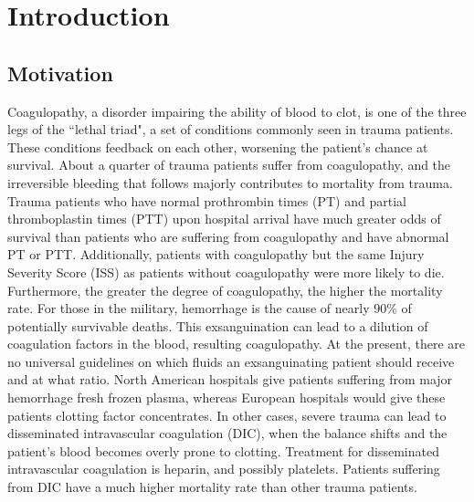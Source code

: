 \documentclass[12pt]{article}
\begin{document}
\section*{Introduction} 
\subsection*{Motivation} Coagulopathy, a disorder impairing the ability of blood to clot, is one of the three legs of the ``lethal triad", a set of conditions commonly seen in trauma patients. These conditions feedback on each other, worsening the patient's chance at survival. About a quarter of trauma patients suffer from coagulopathy, and the irreversible bleeding that follows majorly contributes to mortality from trauma. \cite{kauvar2006impact} Trauma patients who have normal prothrombin times (PT) and partial thromboplastin times (PTT) upon hospital arrival have much greater odds of survival than patients who are suffering from coagulopathy and have abnormal PT or PTT. \cite{macleod2003early} Additionally, patients with coagulopathy but the same Injury Severity Score (ISS) as patients without coagulopathy were more likely to die. \cite{brohi2003acute} Furthermore, the greater the degree of coagulopathy, the higher the mortality rate. \cite{frith2010definition}
For those in the military, hemorrhage is the cause of nearly 90\% of potentially survivable deaths. \cite{blackbourne2010decreasing} This exsanguination can lead to a dilution of coagulation factors in the blood, resulting coagulopathy.
At the present, there are no universal guidelines on which fluids an exsanguinating patient should receive and at what ratio. North American hospitals give patients suffering from major hemorrhage fresh frozen plasma, whereas European hospitals would give these patients clotting factor concentrates.\cite{hunt2014bleeding} 
In other cases, severe trauma can lead to disseminated intravascular coagulation (DIC), when the balance shifts and the patient's blood becomes overly prone to clotting. \cite{boccaccio1981disseminated} Treatment for disseminated intravascular coagulation is heparin, and possibly platelets.\cite{stacca1989disseminated} Patients suffering from DIC have a much higher mortality rate than other trauma patients. \cite{gando2001disseminated}
\end{document}
